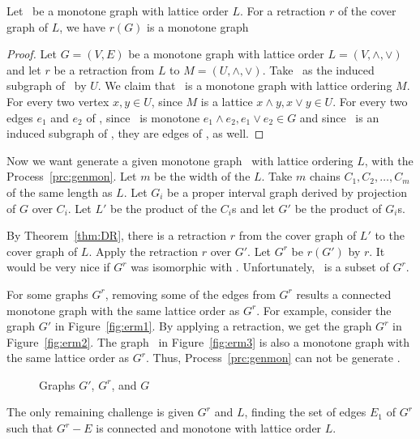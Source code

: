 \begin{lemma} \label{lem:retract}
Let \mG\ be a monotone graph with lattice order \(L\)\@.
For a retraction \(r\) of the cover graph of \(L\), we have \(r(G)\) is a monotone graph
\end{lemma}

\begin{proof}
Let \(G=(V,E)\) be a monotone graph with lattice order \(L=(V, \wedge,\vee)\) and
let \(r\) be a retraction from \(L\) to \(M =(U, \wedge, \vee)\)\@.
Take \mH\ as the induced subgraph of \mG\ by \(U\)\@.
We claim that \mH\ is a monotone graph with lattice ordering \(M\)\@.
For every two vertex \(x,y\in U\), since \(M\) is a lattice
\(x\wedge y,x\vee y\in U\)\@. For every two edges \(e_1\) and \(e_2\) of
\mH, since \mG\ is monotone \(e_1\wedge e_2,e_1\vee e_2\in G\)
and since \mH\ is an induced subgraph of \mG, they are edges of 
\mH, as well.
\end{proof}

Now we want generate a given monotone graph \mG\ with lattice ordering \(L\),
with the Process~\ref{prc:genmon}. Let \(m\) be the width of the \(L\)\@.
Take \(m\) chains \(C_1,C_2,\dotsc,C_m\) of the same length as \(L\)\@.
Let \(G_i\) be a proper interval graph derived by projection of \(G\) over \(C_i\)\@. 
Let \(L'\) be the product of the \(C_i\)s and let \(G'\) be the product of \(G_i\)s.

By Theorem~\ref{thm:DR}, there is a retraction \(r\) from the cover graph of \(L'\) to the cover graph of \(L\)\@.
Apply the retraction \(r\) over \(G'\)\@.
Let \(G^r\) be \(r(G')\) by \(r\)\@.
It would be very nice if \(G^r\) was isomorphic with \mG\@. Unfortunately, \mG\ is a subset of \(G^r\)\@.

For some graphs \(G^r\), removing some of the edges from \(G^r\) results a connected 
monotone graph with the same lattice order as \(G^r\)\@.
For example, consider the graph \(G'\) in
Figure~\ref{fig:erm1}\@. By applying a retraction, we get the
graph \(G^r\) in Figure~\ref{fig:erm2}\@. The graph
\mG\ in Figure~\ref{fig:erm3} is also a monotone graph with the same lattice order 
as \(G^r\)\@. Thus, Process~\ref{prc:genmon} can not be generate \mG\@. 

\begin{figure}
\hfill
\subfigure[\ensuremath{G'}]{\label{fig:erm1}}\hfill 
\subfigure[\ensuremath{G^r}]{\label{fig:erm2}}\hfill 
\subfigure[\ensuremath{G}]{\label{fig:erm3}}\hfill 
\caption{Graphs \ensuremath{G'}, \ensuremath{G^r}, and \ensuremath{G}}
\end{figure}

The only remaining challenge is given \(G^r\) and \(L\), 
finding the set of edges \(E_1\) of \(G^r\) such that 
\(G^r - E\) is connected and monotone with lattice order \(L\)\@.
